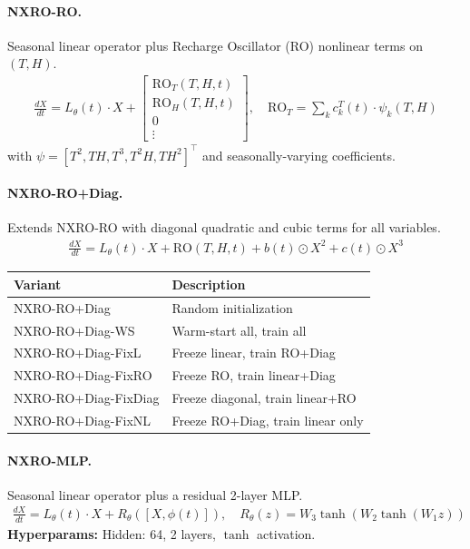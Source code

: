 \paragraph{NXRO-RO.}
Seasonal linear operator plus Recharge Oscillator (RO) nonlinear terms on $(T, H)$.
\begin{align*}
    \frac{dX}{dt} = L_\theta(t) \cdot X + \begin{bmatrix} \text{RO}_T(T,H,t) \\ \text{RO}_H(T,H,t) \\ 0 \\ \vdots \end{bmatrix}, \quad
    \text{RO}_T = \sum_{k} c^T_k(t) \cdot \psi_k(T,H)
\end{align*}
with $\psi = [T^2, TH, T^3, T^2H, TH^2]^\top$ and seasonally-varying coefficients.

\paragraph{NXRO-RO+Diag.}
Extends NXRO-RO with diagonal quadratic and cubic terms for all variables.
\begin{align*}
    \frac{dX}{dt} = L_\theta(t) \cdot X + \text{RO}(T,H,t) + b(t) \odot X^2 + c(t) \odot X^3
\end{align*}

\begin{tabular}{@{}ll@{}}
\textbf{Variant} & \textbf{Description} \\
\hline
NXRO-RO+Diag & Random initialization \\
NXRO-RO+Diag-WS & Warm-start all, train all \\
NXRO-RO+Diag-FixL & Freeze linear, train RO+Diag \\
NXRO-RO+Diag-FixRO & Freeze RO, train linear+Diag \\
NXRO-RO+Diag-FixDiag & Freeze diagonal, train linear+RO \\
NXRO-RO+Diag-FixNL & Freeze RO+Diag, train linear only \\
\end{tabular}

\paragraph{NXRO-MLP.}
Seasonal linear operator plus a residual 2-layer MLP.
\begin{align*}
    \frac{dX}{dt} = L_\theta(t) \cdot X + R_\theta([X, \phi(t)]), \quad
    R_\theta(z) = W_3 \tanh(W_2 \tanh(W_1 z))
\end{align*}
\textbf{Hyperparams:} Hidden: 64, 2 layers, $\tanh$ activation.

